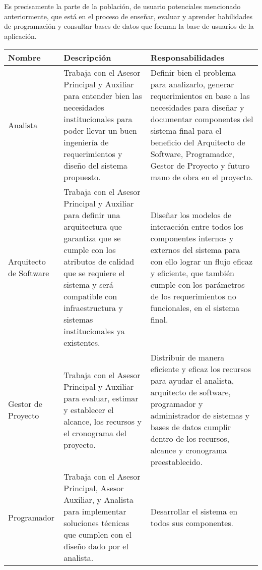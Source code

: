 Es precisamente la parte de la población, de usuario potenciales mencionado anteriormente, que está en el proceso de enseñar, evaluar y aprender habilidades de programación y consultar bases de datos que forman la base de usuarios de la aplicación.

\begin{longtable}{|p{}|p{}|p{}|}
  \hline
  \textbf{Nombre} & \textbf{Descripción} & \textbf{Responsabilidades} \\
  \hline
  \endhead
  Analista & Trabaja con el Asesor Principal y Auxiliar para entender bien las necesidades institucionales para poder llevar un buen ingeniería de requerimientos y diseño del sistema propuesto. & Definir bien el problema para analizarlo, generar requerimientos en base a las necesidades para diseñar y documentar componentes del sistema final para el beneficio del Arquitecto de Software, Programador, Gestor de Proyecto y futuro mano de obra en el proyecto. \\
  \hline
  Arquitecto de Software & Trabaja con el Asesor Principal y Auxiliar para definir una arquitectura que garantiza que se cumple con los atributos de calidad que se requiere el sistema y será compatible con infraestructura y sistemas institucionales ya existentes. & Diseñar los modelos de interacción entre todos los componentes internos y externos del sistema para con ello lograr un flujo eficaz y eficiente, que también cumple con los parámetros de los requerimientos no funcionales, en el sistema final. \\
  \hline
  Gestor de Proyecto & Trabaja con el Asesor Principal y Auxiliar para evaluar, estimar y establecer el alcance, los recursos y el cronograma del proyecto. & Distribuir de manera eficiente y eficaz los recursos para ayudar el analista, arquitecto de software, programador y administrador de sistemas y bases de datos cumplir dentro de los recursos, alcance y cronograma preestablecido. \\
  \hline
  Programador & Trabaja con el Asesor Principal, Asesor Auxiliar, y Analista para implementar soluciones técnicas que cumplen con el diseño dado por el analista. & Desarrollar el sistema en todos sus componentes. \\

\end{longtable}
